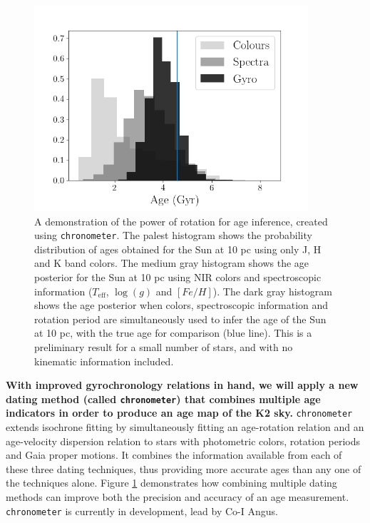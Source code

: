 \documentclass[12pt]{article}
\begin{document}
\begin{figure}[!t]
\centering
\includegraphics[width=4in]{all_hist_working.png}
\caption{A demonstration of the power of rotation for age
    inference, created using {\tt chronometer}.
    The palest histogram shows the probability distribution of ages
    obtained for the Sun at 10 pc using only J, H and K band colors.
    The medium gray histogram shows the age posterior for the Sun at 10
    pc using NIR colors and spectroscopic information ($T_{\mathrm{eff}}$,
    $\log(g)$ and $[Fe/H]$).
    The dark gray histogram shows the age posterior when colors,
    spectroscopic information and rotation period are simultaneously used to infer the age of
    the Sun at 10 pc, with the true age for comparison (blue line).
    This is a preliminary result for a small number of stars, and with no kinematic information included.
}
\label{fig:chrono}
\end{figure}



{\bf With improved gyrochronology relations in hand, we
will apply a new dating method (called {\tt chronometer}) that combines
multiple age indicators in order to produce an age map of the K2 sky.}
{\tt chronometer} extends isochrone fitting by simultaneously fitting an
age-rotation relation and an age-velocity dispersion relation to stars with
photometric colors, rotation periods and Gaia proper motions.
It combines the information available from each of these three dating techniques, thus
providing more accurate ages than any one of the techniques alone.
Figure \ref{fig:chrono} demonstrates how combining multiple dating methods can
improve both the precision and accuracy of an age measurement.
{\tt chronometer} is currently in development, lead by Co-I Angus.
\end{document}
